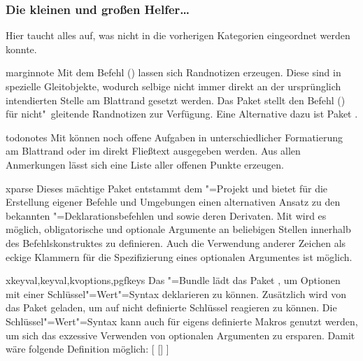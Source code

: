 \subsubsection{Die kleinen und großen Helfer\dots}
Hier taucht alles auf, was nicht in die vorherigen Kategorien eingeordnet 
werden konnte.
%
\begin{packages}
\item[marginnote]
  Mit dem Befehl () lassen sich 
  Randnotizen erzeugen. Diese sind in  spezielle Gleitobjekte, 
  wodurch selbige nicht immer direkt an der ursprünglich intendierten Stelle am 
  Blattrand gesetzt werden. Das Paket  stellt den Befehl 
  () für nicht"~gleitende Randnotizen zur 
  Verfügung. Eine Alternative dazu ist Paket .
\item[todonotes]
  Mit  können noch offene Aufgaben in unterschiedlicher 
  Formatierung am Blattrand oder im direkt Fließtext ausgegeben werden. Aus 
  allen Anmerkungen lässt sich eine Liste aller offenen Punkte erzeugen.
\item[xparse]
  Dieses mächtige Paket entstammt dem "=Projekt und bietet für 
  die Erstellung eigener Befehle und Umgebungen einen alternativen Ansatz zu 
  den bekannten "=Deklarationsbefehlen  und 
   sowie deren Derivaten. Mit  wird es 
  möglich, obligatorische und optionale Argumente an beliebigen Stellen 
  innerhalb des Befehlskonstruktes zu definieren. Auch die Verwendung anderer 
  Zeichen als eckige Klammern für die Spezifizierung eines optionalen 
  Argumentes ist möglich.
\item[xkeyval,keyval,kvoptions,pgfkeys]
  Das \KOMAScript"=Bundle lädt das Paket , um Optionen mit 
  einer Schlüssel"=Wert"=Syntax deklarieren zu können. Zusätzlich wird von 
  \TUDScript das Paket  geladen, um auf nicht definierte 
  Schlüssel reagieren zu können. Die Schlüssel"=Wert"=Syntax kann auch für 
  eigens definierte Makros genutzt werden, um sich das exzessive Verwenden von 
  optionalen Argumenten zu ersparen. Damit wäre folgende Definition möglich:
  [%
    []%
  ]
  

\end{packages}
